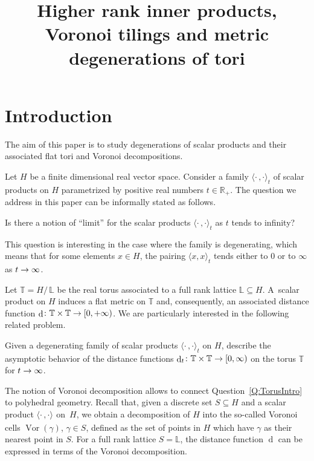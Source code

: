 \documentclass[AHL,Unicode,longabstracts]{cedram}
\title[Higher rank inner products, Voronoi tilings and metric degenerations of tori]{Higher rank inner products, Voronoi tilings and metric degenerations of tori}
\author[\initial{O.} \lastname{Amini}]{\firstname{Omid} \lastname{Amini}}
\author[\initial{N.} \lastname{Nicolussi}]{\firstname{Noema} \lastname{Nicolussi}}
\newcommand{\innone}[2]{{\langle#2\rangle_{#1}}}
\newcommand{\rquot}[2]{#1/\,#2}
\DeclareMathOperator{\Vor}{Vor}
\DeclareMathOperator{\dist}{d}
\newcommand{\R}{\mathbb{R}}
\newcommand{\T}{\mathbb{T}}
\renewcommand{\L}{\mathbb{L}}
\renewcommand*{\to}{\mathchoice{\longrightarrow}{\rightarrow}{\rightarrow}{\rightarrow}}
\begin{document}
\maketitle



\section{Introduction}


The aim of this paper is to study degenerations of scalar products and their associated flat tori and Voronoi decompositions.

Let $H$ be a finite dimensional real vector space. Consider a family $\innone{t}{\cdot\,, \cdot}$ of scalar products on $H$ parametrized by positive real numbers $t\in \R_+$. The question we address in this paper can be informally stated as follows.



\begin{ques}
Is there a notion of ``limit'' for the scalar products $\innone{t}{\cdot\,, \cdot}$ as $t$ tends to infinity?
\end{ques}

This question is interesting in the case where the family is degenerating, which means that for some elements $x \in H$, the pairing $\innone{t}{x, x}$ tends either to $0$ or to $\infty$ as $t \to\infty$.



Let $\T =\rquot{H}{\L}$ be the real torus associated to a full rank lattice $\L \subseteq H$. A~scalar product on $H$ induces a flat metric on $\T$ and, consequently, an associated distance function $\dist \colon \T\times \T \to [0, +\infty)$. We are particularly interested in the following related problem.

\begin{ques} \label{Q:TorusIntro}
Given a degenerating family of scalar products $\innone{t}{\cdot\,, \cdot}$ on $H$, describe the asymptotic behavior of the distance functions $\dist_t \colon \T \times \T \to [0, \infty)$ on the torus $\T$ for $t \to \infty$.
\end{ques}



The notion of Voronoi decomposition allows to connect Question~\ref{Q:TorusIntro} to polyhedral geometry. Recall that, given a discrete set $S \subseteq H$ and a scalar product $\innone{}{\cdot\,, \cdot}$ on~$H$, we obtain a decomposition of $H$ into the so-called Voronoi cells $\Vor(\gamma)$, $\gamma\in S$, defined as the set of points in $H$ which have $\gamma$ as their nearest point in $S$. For a full rank lattice $S = \L$, the distance function $\dist$ can be expressed in terms of the Voronoi decomposition.
\end{document}
